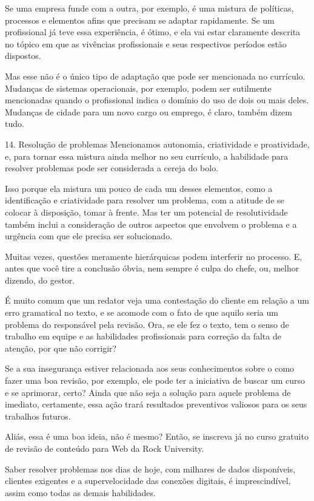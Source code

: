 \begin{commentA}
Se uma empresa funde com a outra, por exemplo, é uma mistura de políticas, processos e elementos afins que precisam se adaptar rapidamente. Se um profissional já teve essa experiência, é ótimo, e ela vai estar claramente descrita no tópico em que as vivências profissionais e seus respectivos períodos estão dispostos.

Mas esse não é o único tipo de adaptação que pode ser mencionada no currículo. Mudanças de sistemas operacionais, por exemplo, podem ser sutilmente mencionadas quando o profissional indica o domínio do uso de dois ou mais deles. Mudanças de cidade para um novo cargo ou emprego, é claro, também dizem tudo.

14. Resolução de problemas
Mencionamos autonomia, criatividade e proatividade, e, para tornar essa mistura ainda melhor no seu currículo, a habilidade para resolver problemas pode ser considerada a cereja do bolo.

Isso porque ela mistura um pouco de cada um desses elementos, como a identificação e criatividade para resolver um problema, com a atitude de se colocar à disposição, tomar à frente. Mas ter um potencial de resolutividade também inclui a consideração de outros aspectos que envolvem o problema e a urgência com que ele precisa ser solucionado.

Muitas vezes, questões meramente hierárquicas podem interferir no processo. E, antes que você tire a conclusão óbvia, nem sempre é culpa do chefe, ou, melhor dizendo, do gestor.

É muito comum que um redator veja uma contestação do cliente em relação a um erro gramatical no texto, e se acomode com o fato de que aquilo seria um problema do responsável pela revisão. Ora, se ele fez o texto, tem o senso de trabalho em equipe e as habilidades profissionais para correção da falta de atenção, por que não corrigir?

Se a sua insegurança estiver relacionada aos seus conhecimentos sobre o como fazer uma boa revisão, por exemplo, ele pode ter a iniciativa de buscar um curso e se aprimorar, certo? Ainda que não seja a solução para aquele problema de imediato, certamente, essa ação trará resultados preventivos valiosos para os seus trabalhos futuros.

Aliás, essa é uma boa ideia, não é mesmo? Então, se inscreva já no curso gratuito de revisão de conteúdo para Web da Rock University.

Saber resolver problemas nos dias de hoje, com milhares de dados disponíveis, clientes exigentes e a supervelocidade das conexões digitais, é imprescindível, assim como todas as demais habilidades.


\end{commentA}
